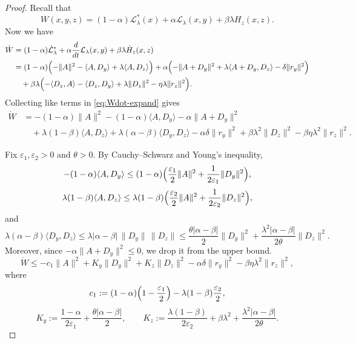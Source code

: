 \documentclass{article}
\newcommand{\1}{\mathbf{1}}
\begin{document}
\begin{proof}
\medskip
\noindent Recall that
\[
W(x,y,z)=(1-\alpha)\mathcal L_\lambda^{*}(x)+\alpha \mathcal L_\lambda(x,y)+\beta\lambda H_z(x,z).
\]
\noindent Now we have
\begin{align}
\dot W
&=(1-\alpha)\dot{\mathcal L}_\lambda^{*}+\alpha\frac{d}{dt}\mathcal L_\lambda(x,y)+\beta\lambda \dot H_z(x,z)
\nonumber\\
&=(1-\alpha)\Bigl(-\|A\|^{2}-\langle A,D_y\rangle+\lambda\langle A,D_z\rangle\Bigr)
+\alpha\Bigl(-\|A+D_y\|^{2}+\lambda\langle A+D_y,D_z\rangle-\delta\|r_y\|^{2}\Bigr)
\nonumber\\
&\quad+\beta\lambda\Bigl(-\langle D_z,A\rangle-\langle D_z,D_y\rangle+\lambda\|D_z\|^{2}-\eta\lambda\|r_z\|^{2}\Bigr).
\label{eq:Wdot-expand}
\end{align}
Collecting like terms in \eqref{eq:Wdot-expand} gives
\begin{align}
\dot W
&= -(1-\alpha)\|A\|^{2}
   -(1-\alpha)\langle A,D_y\rangle
   -\alpha\|A+D_y\|^{2}
\nonumber\\
&\quad +\lambda(1-\beta)\langle A,D_z\rangle
       +\lambda(\alpha-\beta)\langle D_y,D_z\rangle
       -\alpha\delta\|r_y\|^{2}
       +\beta\lambda^{2}\|D_z\|^{2}
       -\beta\eta\lambda^{2}\|r_z\|^{2}.
\label{eq:Wdot-raw}
\end{align}

\noindent Fix $\varepsilon_1,\varepsilon_2>0$ and $\theta>0$. By Cauchy--Schwarz and Young's inequality,
\[
-(1-\alpha)\langle A,D_y\rangle
\le (1-\alpha)\Bigl(\frac{\varepsilon_1}{2}\|A\|^{2}+\frac{1}{2\varepsilon_1}\|D_y\|^{2}\Bigr),
\]
\[
\lambda(1-\beta)\langle A,D_z\rangle
\le \lambda(1-\beta)\Bigl(\frac{\varepsilon_2}{2}\|A\|^{2}+\frac{1}{2\varepsilon_2}\|D_z\|^{2}\Bigr),
\]
and
\[
\lambda(\alpha-\beta)\langle D_y,D_z\rangle
\le
\lambda|\alpha-\beta|\,\|D_y\|\,\|D_z\|
\le
\frac{\theta|\alpha-\beta|}{2}\|D_y\|^2
+
\frac{\lambda^2|\alpha-\beta|}{2\theta}\|D_z\|^2.
\]
Moreover, since $-\alpha\|A+D_y\|^2\le 0$, we drop it from the upper bound. 
\begin{equation}\label{eq:Wdot-mid-bilevel}
\dot W
\le -c_1\|A\|^{2}
     +K_y\|D_y\|^{2}
     +K_z\|D_z\|^{2}
     -\alpha\delta\|r_y\|^{2}
     -\beta\eta\lambda^{2}\|r_z\|^{2},
\end{equation}
where
\begin{equation}\label{eq:c1-def}
c_1:= (1-\alpha)\Bigl(1-\frac{\varepsilon_1}{2}\Bigr)-\lambda(1-\beta)\frac{\varepsilon_2}{2},
\end{equation}
\begin{equation}\label{eq:KyKz-def}
K_y:=\frac{1-\alpha}{2\varepsilon_1}
+\frac{\theta|\alpha-\beta|}{2},
\qquad
K_z:=\frac{\lambda(1-\beta)}{2\varepsilon_2}
+\beta\lambda^{2}
+\frac{\lambda^2|\alpha-\beta|}{2\theta}.
\end{equation}


\end{proof}
\end{document}
